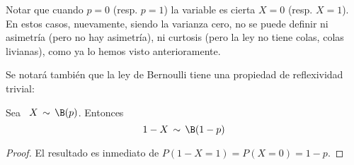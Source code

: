 Notar que cuando $p = 0$ (resp. $p = 1$) la variable es cierta $X = 0$ (resp. $X
= 1$). En estos casos, nuevamente,  siendo la varianza cero, no se puede definir
ni asimetr\'ia  (pero no  hay asimetr\'ia),  ni curtosis (pero  la ley  no tiene
colas, \ie colas livianas), como ya lo hemos visto anterioramente.

Se  notar\'a  tambi\'en  que  la   ley  de  Bernoulli  tiene  una  propiedad  de
reflexividad trivial:
%
\begin{lema}[Reflexividad]
\label{Lem:MP:ReflexividadBernoulli}
%
  Sea \ $X \, \sim \, \B(p)$. Entonces
  \[
  1-X \, \sim \, \B(1-p)
  \]
\end{lema}
\begin{proof}
El resultado es inmediato de $P(1-X = 1) = P(X = 0) = 1-p$.
\end{proof}
